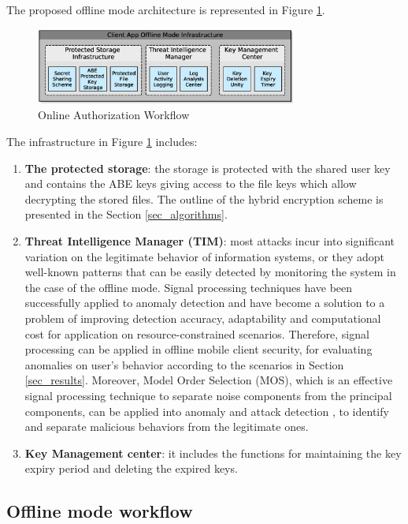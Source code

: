 \documentclass[twocolumn]{svjour3}          %
\begin{document}
The proposed offline mode architecture is represented in Figure \ref{fig:5}.

\begin{figure}[h!]
	\centering
	\includegraphics[width=8.6cm]{figures/offlinesecurityarchitecture.eps}
	\caption{Online Authorization Workflow}
	\label{fig:5}
\end{figure}

The infrastructure in Figure \ref{fig:5} includes:

\begin{enumerate}
	\item \textbf{The protected storage}: the storage is protected with the shared user key and contains the ABE keys giving access to the file keys which allow decrypting the stored files. The outline of the hybrid encryption scheme is presented in the Section \ref{sec_algorithms}.
	\item \textbf{Threat Intelligence Manager (TIM)}: most attacks incur into significant variation on the legitimate behavior of information systems, or they adopt well-known patterns that can be easily detected by monitoring the system in the case of the offline mode. Signal processing techniques have been successfully applied to anomaly detection \cite{lu2009network, huang2009signal} and have become a solution to a problem of improving detection accuracy, adaptability and computational cost for application on resource-constrained scenarios. Therefore, signal processing can be applied in offline mobile client security, for evaluating anomalies on user's behavior according to the scenarios in Section \ref{sec_results}. Moreover, Model Order Selection (MOS), which is an effective signal processing technique to separate noise components from the principal components, can be applied into anomaly and attack detection \cite{tenorio2013greatest}, to identify and separate malicious behaviors from the legitimate ones.
	\item \textbf{Key Management center}: it includes the functions for maintaining the key expiry period and deleting the expired keys. 
\end{enumerate}

\subsection{Offline mode workflow}
\label{sec_offline_mode_workflow}
\end{document}
